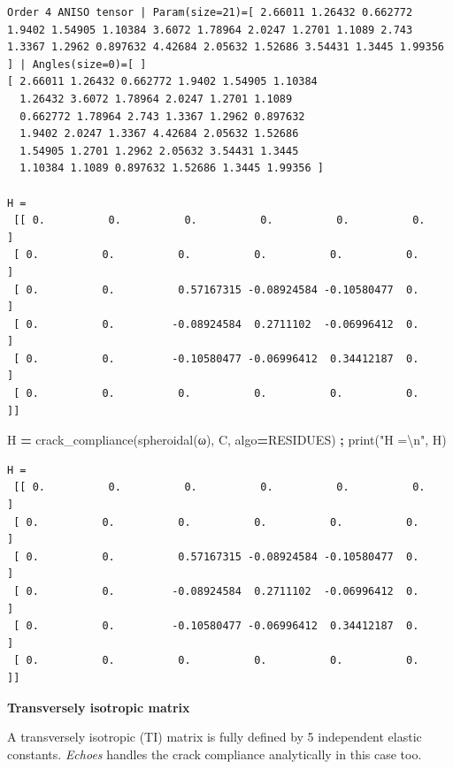 \documentclass[
  a4paper,
  numbers=noendperiod,
  DIV=12]{scrreprt}
\newenvironment{Shaded}{\begin{snugshade}}{\end{snugshade}}
\newcommand{\BuiltInTok}[1]{#1}
\newcommand{\CharTok}[1]{\textcolor[rgb]{0.31,0.60,0.02}{#1}}
\newcommand{\NormalTok}[1]{#1}
\newcommand{\OperatorTok}[1]{\textcolor[rgb]{0.81,0.36,0.00}{\textbf{#1}}}
\newcommand{\StringTok}[1]{\textcolor[rgb]{0.31,0.60,0.02}{#1}}
\begin{document}
\begin{verbatim}
Order 4 ANISO tensor | Param(size=21)=[ 2.66011 1.26432 0.662772 1.9402 1.54905 1.10384 3.6072 1.78964 2.0247 1.2701 1.1089 2.743 1.3367 1.2962 0.897632 4.42684 2.05632 1.52686 3.54431 1.3445 1.99356 ] | Angles(size=0)=[ ]
[ 2.66011 1.26432 0.662772 1.9402 1.54905 1.10384 
  1.26432 3.6072 1.78964 2.0247 1.2701 1.1089 
  0.662772 1.78964 2.743 1.3367 1.2962 0.897632 
  1.9402 2.0247 1.3367 4.42684 2.05632 1.52686 
  1.54905 1.2701 1.2962 2.05632 3.54431 1.3445 
  1.10384 1.1089 0.897632 1.52686 1.3445 1.99356 ]

H =
 [[ 0.          0.          0.          0.          0.          0.        ]
 [ 0.          0.          0.          0.          0.          0.        ]
 [ 0.          0.          0.57167315 -0.08924584 -0.10580477  0.        ]
 [ 0.          0.         -0.08924584  0.2711102  -0.06996412  0.        ]
 [ 0.          0.         -0.10580477 -0.06996412  0.34412187  0.        ]
 [ 0.          0.          0.          0.          0.          0.        ]]
\end{verbatim}

\begin{Shaded}
\begin{Highlighting}[]
\NormalTok{H }\OperatorTok{=}\NormalTok{ crack\_compliance(spheroidal(ω), C, algo}\OperatorTok{=}\NormalTok{RESIDUES) }\OperatorTok{;} \BuiltInTok{print}\NormalTok{(}\StringTok{"H =}\CharTok{\textbackslash{}n}\StringTok{"}\NormalTok{, H)}
\end{Highlighting}
\end{Shaded}

\begin{verbatim}
H =
 [[ 0.          0.          0.          0.          0.          0.        ]
 [ 0.          0.          0.          0.          0.          0.        ]
 [ 0.          0.          0.57167315 -0.08924584 -0.10580477  0.        ]
 [ 0.          0.         -0.08924584  0.2711102  -0.06996412  0.        ]
 [ 0.          0.         -0.10580477 -0.06996412  0.34412187  0.        ]
 [ 0.          0.          0.          0.          0.          0.        ]]
\end{verbatim}

\textbf{Transversely isotropic matrix}

A transversely isotropic (TI) matrix is fully defined by 5 independent
elastic constants. \emph{Echoes} handles the crack compliance
analytically in this case too.
\end{document}
